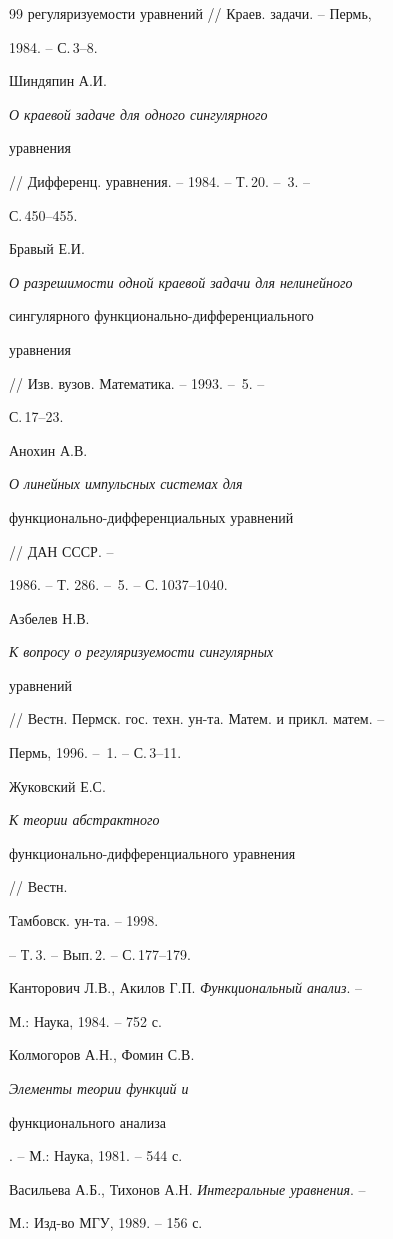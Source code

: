 \begin{thebibliography}{99}
{регуляризуемости уравнений} // Краев. задачи. -- Пермь,  


1984. -- С.\,3--8. 




Шиндяпин А.И. {\em О краевой задаче для одного сингулярного  


уравнения} // Дифференц. уравнения. -- 1984. -- Т.\,20. -- \No\,3. -- 


С.\,450--455. 




Бравый Е.И. {\em О разрешимости одной краевой задачи для нелинейного  


сингулярного функционально-дифференциального  


уравнения} // Изв. вузов. Математика. -- 1993. -- \No\,5. -- 


С.\,17--23. 




Анохин А.В. {\em О линейных импульсных системах для  


функционально-дифференциальных уравнений} // ДАН СССР. -- 


1986. -- Т. 286. -- \No\,5. -- С.\,1037--1040.  




Азбелев Н.В. {\em К вопросу о регуляризуемости сингулярных  


уравнений} // Вестн. Пермск. гос. техн. ун-та. Матем. и прикл. матем. -- 


Пермь, 1996. -- \No\,1. -- С.\,3--11.  




Жуковский Е.С. {\em К теории абстрактного  


функционально-дифференциального уравнения} // Вестн. 


Тамбовск. ун-та. -- 1998.  


-- Т.\,3. -- Вып.\,2. -- С.\,177--179. 




Канторович Л.В., Акилов Г.П. {\em Функциональный анализ}. -- 


М.: Наука, 1984. -- 752 с. 




Колмогоров А.Н., Фомин С.В. {\em Элементы теории функций и 


функционального анализа}. -- М.: Наука, 1981. -- 544 с.  




Васильева А.Б., Тихонов А.Н. {\em Интегральные уравнения}. -- 


М.: Изд-во МГУ, 1989. -- 156 с. 


 


\end{thebibliography} 


 


\vskip 2cm 


 






 


\label{end} 


 


